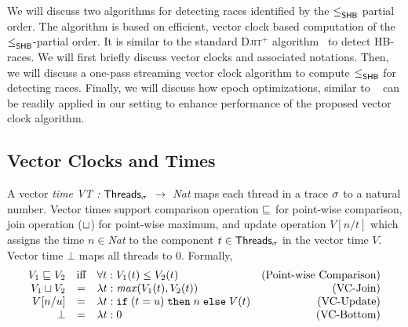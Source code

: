 
We will discuss two algorithms for detecting races identified by the
$\leq^{}_{\mathsf{SHB}}$ partial order. 
The algorithm is based on efficient, vector clock based
computation of the $\leq^{}_{\mathsf{SHB}}$-partial order. It is similar to the
standard \textsc{Djit}$^+$
algorithm~\cite{Pozniansky:2003:EOD:966049.781529} to detect
HB-races. We will first briefly discuss vector clocks and
associated notations.  Then, we will discuss a one-pass streaming
vector clock algorithm to compute $\leq^{}_{\mathsf{SHB}}$ for detecting races.  
Finally, we will discuss how epoch optimizations, similar to \fasttrack~\cite{fasttrack} 
can be readily applied in our setting to enhance performance
of the proposed vector clock algorithm.

\subsection{Vector Clocks and Times}
A vector \emph{time} \textit{VT : $\mathsf{Threads}_{\sigma}$ $\to$ Nat} maps each
thread in a trace $\sigma$ to a natural number.  Vector times support
comparison operation $\sqsubseteq$ for point-wise comparison, join operation
($\sqcup$) for point-wise maximum, and update operation $V[n/t]$ which
assigns the time $n \in $\textit{Nat} to the component $t
\in \mathsf{Threads}_{\sigma}$ in the vector time $V$.  Vector time $\bot$ maps all
threads to 0. Formally, 
%
\begin{align*}
\begin{array}{rclr}
V_1 \sqsubseteq V_2 & \text{iff} & \forall t: V_1(t) \le V_2(t) & \text{(Point-wise Comparison)}\\
V_1 \sqcup V_2 & = & \lambda t: \mathit{max}(V_1(t), V_2(t))  & \text{(VC-Join)}\\
V[n/u] & = & \lambda t: \mathtt{if}\; (t = u)\; \mathtt{then}\; n\; \mathtt{else}\; V(t) & \text{(VC-Update)}\\
\bot & = & \lambda t: 0 & \text{(VC-Bottom)}
\end{array}
\end{align*}
